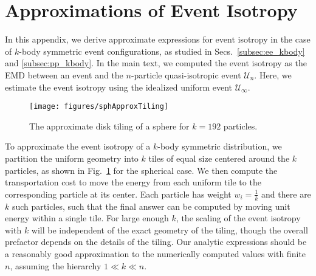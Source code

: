 \documentclass[letterpaper,11pt]{article}
\DeclareRobustCommand{\Secs}[2]{Secs.~\ref{#1} and \ref{#2}}
\DeclareRobustCommand{\Fig}[1]{Fig.~\ref{#1}}
\begin{document}
\appendix

\section{Approximations of Event Isotropy}
\label{app:eiApp}


In this appendix, we derive approximate expressions for event isotropy in the case of $k$-body symmetric event configurations, as studied in \Secs{subsec:ee_kbody}{subsec:pp_kbody}.
%
In the main text, we computed the event isotropy as the EMD between an event and the $n$-particle quasi-isotropic event $\mathcal{U}_n$. 
%
Here, we estimate the event isotropy using the idealized uniform event $\mathcal{U}_\infty$.


\begin{figure}[t!]
\centering
%
\texttt{[image: figures/sphApproxTiling]}
%
\caption{The approximate disk tiling of a sphere for $k=192$ particles.}
%
\label{fig:sphAnalytic}
%
\end{figure}


To approximate the event isotropy of a $k$-body symmetric distribution, we partition the uniform geometry into $k$ tiles of equal size centered around the $k$ particles, as shown in \Fig{fig:sphAnalytic} for the spherical case.
%
We then compute the transportation cost to move the energy from each uniform tile to the corresponding particle at its center.
%
Each particle has weight $w_i = \frac{1}{k}$ and there are $k$ such particles, such that the final answer can be computed by moving unit energy within a single tile. 
%
For large enough $k$, the scaling of the event isotropy with $k$ will be independent of the exact geometry of the tiling, though the overall prefactor depends on the details of the tiling.
%
Our analytic expressions should be a reasonably good approximation to the numerically computed values with finite $n$, assuming the hierarchy $1 \ll k \ll n$. 
\end{document}
